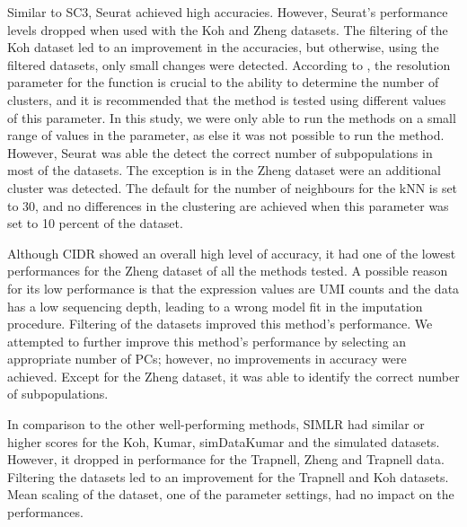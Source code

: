 \documentclass[11pt, a4paper]{article}\usepackage[]{graphicx}\usepackage[]{color}
\begin{document}
Similar to SC3, Seurat achieved high accuracies. However, Seurat’s performance levels dropped when used with the Koh and Zheng datasets. The filtering of the Koh dataset led to an improvement in the accuracies, but otherwise, using the filtered datasets, only small changes were detected.   According to \citep{butler2017integrated}, the resolution parameter for the function is crucial to the ability to determine the number of clusters, and it is recommended that the method is tested using different values of this parameter. In this study, we were only able to run the methods on a small range of values in the parameter, as else it was not possible to run the method. However, Seurat was able the detect the correct number of subpopulations in most of the datasets. The exception is in the Zheng dataset were an additional cluster was detected.  The default for the number of neighbours for the kNN  is set to 30, and no differences in the clustering are achieved when this parameter was set to 10 percent of the dataset. 

Although CIDR showed an overall high level of accuracy, it had one of the lowest performances for the Zheng dataset of all the methods tested. A possible reason for its low performance is that the expression values are UMI counts and the data has a low sequencing depth, leading to a wrong model fit in the imputation procedure. Filtering of the datasets improved this method’s performance. We attempted to further improve this method’s performance by selecting an appropriate number of PCs; however, no improvements in accuracy were achieved. 
Except for the Zheng dataset, it was able to identify the correct number of subpopulations.


In comparison to the other well-performing methods, SIMLR had similar or higher scores for the Koh, Kumar, simDataKumar and the simulated datasets. However, it dropped in performance for the Trapnell, Zheng and Trapnell data. 
Filtering the datasets led to an improvement for the Trapnell and Koh datasets. Mean scaling of the dataset, one of the parameter settings,  had no impact on the performances.
\end{document}
